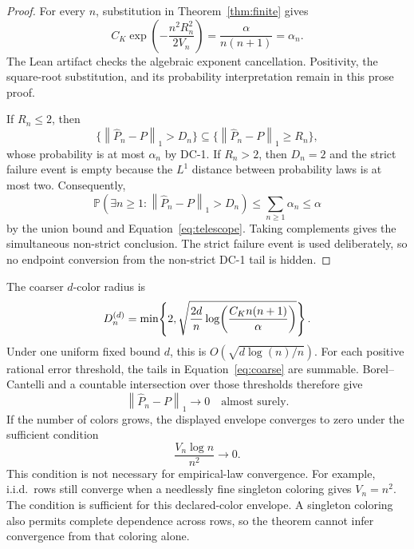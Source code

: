 \documentclass[11pt]{article}
\theoremstyle{definition}
\newcommand{\Phat}{\widehat{P}}
\newcommand{\Prb}{\mathbb{P}}
\newcommand{\normone}[1]{\left\lVert #1\right\rVert_1}
\begin{document}
\begin{proof}
For every $n$, substitution in Theorem~\ref{thm:finite} gives
\begin{equation}
  C_K\exp\!\left(-\frac{n^2R_n^2}{2V_n}\right)
  =\frac{\alpha}{n(n+1)}
  =\alpha_n.
\end{equation}
The Lean artifact checks the algebraic exponent cancellation.  Positivity, the square-root
substitution, and its probability interpretation remain in this prose proof.

If $R_n\le2$, then
\begin{equation}
  \{\normone{\Phat_n-P}>D_n\}
  \subseteq
  \{\normone{\Phat_n-P}\ge R_n\},
\end{equation}
whose probability is at most $\alpha_n$ by DC-1.  If $R_n>2$, then $D_n=2$ and the strict failure
event is empty because the $L^1$ distance between probability laws is at most two.  Consequently,
\begin{equation}
  \Prb\!\left(\exists n\ge1:\normone{\Phat_n-P}>D_n\right)
  \le\sum_{n\ge1}\alpha_n\le\alpha
\end{equation}
by the union bound and Equation~\eqref{eq:telescope}.  Taking complements gives the simultaneous
non-strict conclusion.  The strict failure event is used deliberately, so no endpoint conversion
from the non-strict DC-1 tail is hidden.
\end{proof}

The coarser $d$-color radius is
\begin{equation}\label{eq:anytime-coarse}
  D_n^{(d)}=
  \min\!\left\{
    2,
    \sqrt{%
      \frac{2d}{n}
      \log\!\left(\frac{C_Kn(n+1)}{\alpha}\right)
    }
  \right\}.
\end{equation}
Under one uniform fixed bound $d$, this is $O(\sqrt{d\log(n)/n})$.  For each positive rational
error threshold, the tails in Equation~\eqref{eq:coarse} are summable.  Borel--Cantelli and a
countable intersection over those thresholds therefore give
\begin{equation}
  \normone{\Phat_n-P}\longrightarrow0
  \quad\text{almost surely}.
\end{equation}
If the number of colors grows, the displayed envelope converges to zero under the sufficient
condition
\begin{equation}
  \frac{V_n\log n}{n^2}\longrightarrow0.
\end{equation}
This condition is not necessary for empirical-law convergence.  For example, i.i.d.\ rows still
converge when a needlessly fine singleton coloring gives $V_n=n^2$.  The condition is sufficient
for this declared-color envelope.  A singleton coloring also permits complete dependence across
rows, so the theorem cannot infer convergence from that coloring alone.
\end{document}
